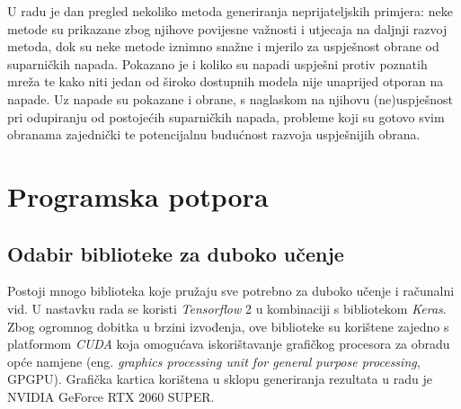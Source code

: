 \documentclass[utf8, diplomski]{fer}
\begin{document}
U radu je dan pregled nekoliko metoda generiranja neprijateljskih primjera: neke metode su prikazane zbog njihove povijesne važnosti i utjecaja na daljnji razvoj metoda, dok su neke metode iznimno snažne i mjerilo za uspješnost obrane od suparničkih napada. Pokazano je i koliko su napadi uspješni protiv poznatih mreža te kako niti jedan od široko dostupnih modela nije unaprijed otporan na napade. Uz napade su pokazane i obrane, s naglaskom na njihovu (ne)uspješnost pri odupiranju od postojećih suparničkih napada, probleme koji su gotovo svim obranama zajednički te potencijalnu budućnost razvoja uspješnijih obrana. 


\chapter{Programska potpora}
\section{Odabir biblioteke za duboko učenje}
Postoji mnogo biblioteka koje pružaju sve potrebno za duboko učenje i računalni vid. U nastavku rada se koristi \textit{Tensorflow} 2\citep{abadi2016tensorflow} u kombinaciji s bibliotekom \textit{Keras}\citep{chollet2015keras}. Zbog ogromnog dobitka u brzini izvođenja, ove biblioteke su korištene zajedno s platformom \textit{CUDA} koja omogućava iskorištavanje grafičkog procesora za obradu opće namjene (eng. \textit{graphics processing unit for general purpose processing}, GPGPU). Grafička kartica korištena u sklopu generiranja rezultata u radu je NVIDIA GeForce RTX 2060 SUPER.
\end{document}
